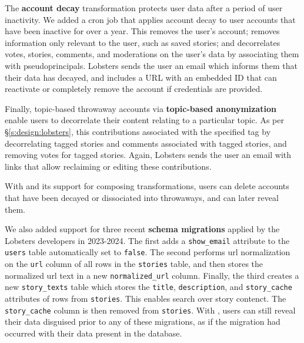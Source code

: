 The \textbf{account decay} transformation protects
user data after a period of user inactivity.
%
We added a cron job that applies account decay to
user accounts that have been inactive for over a year.
%
This
\one{} removes the user's account;
\two{} removes information only relevant to the user, such as saved stories;
\three{} and decorrelates votes, stories, comments, and moderations on the
user's data by associating them with pseudoprincipals.
%
%
%
%
Lobsters sends the user an email which informs them that their data has
decayed, and includes a URL with an embedded \xx ID that can reactivate or
completely remove the account if credentials are provided.
%

Finally, topic-based throwaway accounts via \textbf{topic-based
anonymization}
enable users to decorrelate their content relating to a particular topic.
%
As per \S\ref{s:design:lobsters}, this \xxs contributions associated with the
specified tag by \one{} decorrelating tagged stories and comments associated with
tagged stories, and \two{} removing votes for tagged stories.
%
Again, Lobsters sends the user an email with links that allow reclaiming or
editing these contributions.
%

%
With \sys and its support for composing \xxing transformations, users can
delete accounts that have been decayed or dissociated into throwaways, and
can later reveal them.

%

We also added support for three recent \textbf{schema
migrations} applied by the Lobsters developers in 2023-2024. 
%
The first adds a \texttt{show\_email} attribute to the \texttt{users} table
automatically set to \texttt{false}. 
%
The second performs url normalization~\cite{norm} on the \texttt{url} column of
all rows in the \texttt{stories} table, and then stores the normalized url text
in a new \texttt{normalized\_url} column.
%
Finally, the third creates a new \texttt{story\_texts} table which stores the
\texttt{title}, \texttt{description}, and \texttt{story\_cache} attributes of
rows from \texttt{stories}. This enables search over story contenct. The
\texttt{story\_cache} column is then removed from \texttt{stories}.
%
With \sys, users can still reveal their data disguised prior to any of these
migrations, as if the migration had occurred with their data present in the
database.


